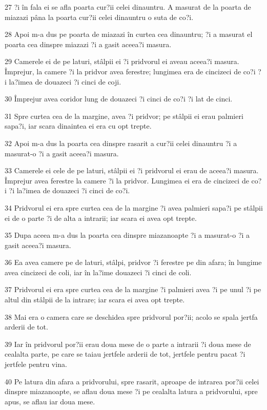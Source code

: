 \par 27 ?i în fala ei se afla poarta cur?ii celei dinauntru. A masurat de la poarta de miazazi pâna la poarta cur?ii celei dinauntru o suta de co?i.
\par 28 Apoi m-a dus pe poarta de miazazi în curtea cea dinauntru; ?i a masurat el poarta cea dinspre miazazi ?i a gasit aceea?i masura.
\par 29 Camerele ei de pe laturi, stâlpii ei ?i pridvorul ei aveau aceea?i masura. Împrejur, la camere ?i la pridvor avea ferestre; lungimea era de cincizeci de co?i ?i la?imea de douazeci ?i cinci de coji.
\par 30 Împrejur avea coridor lung de douazeci ?i cinci de co?i ?i lat de cinci.
\par 31 Spre curtea cea de la margine, avea ?i pridvor; pe stâlpii ei erau palmieri sapa?i, iar scara dinaintea ei era cu opt trepte.
\par 32 Apoi m-a dus la poarta cea dinspre rasarit a cur?ii celei dinauntru ?i a masurat-o ?i a gasit aceea?i masura.
\par 33 Camerele ei cele de pe laturi, stâlpii ei ?i pridvorul ei erau de aceea?i masura. Împrejur avea ferestre la camere ?i la pridvor. Lungimea ei era de cincizeci de co?i ?i la?imea de douazeci ?i cinci de co?i.
\par 34 Pridvorul ei era spre curtea cea de la margine ?i avea palmieri sapa?i pe stâlpii ei de o parte ?i de alta a intrarii; iar scara ei avea opt trepte.
\par 35 Dupa aceea m-a dus la poarta cea dinspre miazanoapte ?i a masurat-o ?i a gasit aceea?i masura.
\par 36 Ea avea camere pe de laturi, stâlpi, pridvor ?i ferestre pe din afara; în lungime avea cincizeci de coli, iar în la?ime douazeci ?i cinci de coli.
\par 37 Pridvorul ei era spre curtea cea de la margine ?i palmieri avea ?i pe unul ?i pe altul din stâlpii de la intrare; iar scara ei avea opt trepte.
\par 38 Mai era o camera care se deschidea spre pridvorul por?ii; acolo se spala jertfa arderii de tot.
\par 39 Iar în pridvorul por?ii erau doua mese de o parte a intrarii ?i doua mese de cealalta parte, pe care se taiau jertfele arderii de tot, jertfele pentru pacat ?i jertfele pentru vina.
\par 40 Pe latura din afara a pridvorului, spre rasarit, aproape de intrarea por?ii celei dinspre miazanoapte, se aflau doua mese ?i pe cealalta latura a pridvorului, spre apus, se aflau iar doua mese.
